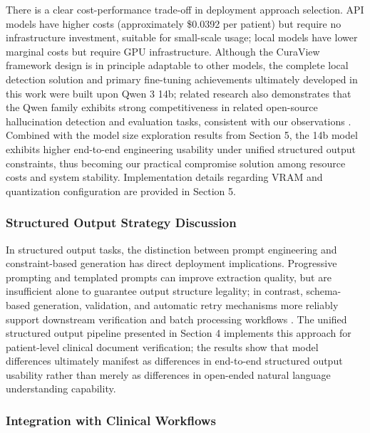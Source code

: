 \documentclass[11pt]{article}
\begin{document}
There is a clear cost-performance trade-off in deployment approach selection. API models have higher costs (approximately \$0.0392 per patient) but require no infrastructure investment, suitable for small-scale usage; local models have lower marginal costs but require GPU infrastructure. Although the CuraView framework design is in principle adaptable to other models, the complete local detection solution and primary fine-tuning achievements ultimately developed in this work were built upon Qwen 3 14b; related research also demonstrates that the Qwen family exhibits strong competitiveness in related open-source hallucination detection and evaluation tasks, consistent with our observations \citep{jiang2025bianHallucination,qi2025mixedContextHallucination,croxford2025clinicalAISummaries,ravi2024lynxEvaluation}. Combined with the model size exploration results from Section 5, the 14b model exhibits higher end-to-end engineering usability under unified structured output constraints, thus becoming our practical compromise solution among resource costs and system stability. Implementation details regarding VRAM and quantization configuration are provided in Section 5.

\subsubsection{Structured Output Strategy Discussion}

In structured output tasks, the distinction between prompt engineering and constraint-based generation has direct deployment implications. Progressive prompting and templated prompts can improve extraction quality, but are insufficient alone to guarantee output structure legality; in contrast, schema-based generation, validation, and automatic retry mechanisms more reliably support downstream verification and batch processing workflows \citep{langchain2024structuredOutput,liu2024structuredOutputBenchmark,lu2025schemaReinforcementLearning,geng2023grammarConstrainedDecoding}. The unified structured output pipeline presented in Section 4 implements this approach for patient-level clinical document verification; the results show that model differences ultimately manifest as differences in end-to-end structured output usability rather than merely as differences in open-ended natural language understanding capability.

\subsubsection{Integration with Clinical Workflows}
\end{document}
